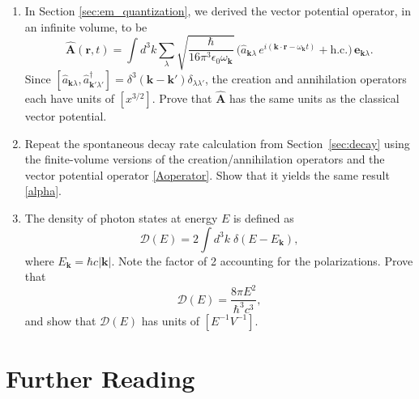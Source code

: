 \documentclass[prx,12pt]{revtex4-2}
\begin{document}
\begin{enumerate}
\item
  In Section \ref{sec:em_quantization}, we derived the vector
  potential operator, in an infinite volume, to be
  \begin{equation}
    \hat{\mathbf{A}}(\mathbf{r},t) = \int d^3k \sum_{\lambda} 
  \sqrt{\frac{\hbar}{16\pi^3\epsilon_0\omega_{\mathbf{k}}}}\,
  \Big(\hat{a}_{\mathbf{k}\lambda} \, e^{i(\mathbf{k}\cdot\mathbf{r} - \omega_{\mathbf{k}} t)}
  + \mathrm{h.c.}\Big)\, \mathbf{e}_{\mathbf{k}\lambda}.
  \end{equation}
  Since $[\hat{a}_{\mathbf{k}\lambda},
    \hat{a}^\dagger_{\mathbf{k}'\lambda'}] =
  \delta^3(\mathbf{k}-\mathbf{k}') \delta_{\lambda\lambda'}$, the
  creation and annihilation operators each have units of $[x^{3/2}]$.
  Prove that $\hat{\mathbf{A}}$ has the same units as the classical
  vector potential.

\item Repeat the spontaneous decay rate calculation from
  Section~\ref{sec:decay} using the finite-volume versions of the
  creation/annihilation operators and the vector potential operator
  \eqref{Aoperator}.  Show that it yields the same result
  \eqref{alpha}.
  \label{ex:alpha_finite}

\item
  The density of photon states at energy $E$ is defined as
  \begin{equation}
    \mathcal{D}(E) = 2\int d^3k\; \delta(E-E_{\mathbf{k}}),
  \end{equation}
  where $E_{\mathbf{k}} = \hbar c |\mathbf{k}|$.  Note the factor of 2
  accounting for the polarizations.  Prove that
  \begin{equation}
    \mathcal{D}(E) = \frac{8\pi E^2}{\hbar^3c^3},
  \end{equation}
  and show that $\mathcal{D}(E)$ has units of $[E^{-1}V^{-1}]$.
  \label{ex:DE}

\end{enumerate}

\section*{Further Reading}
\end{document}
